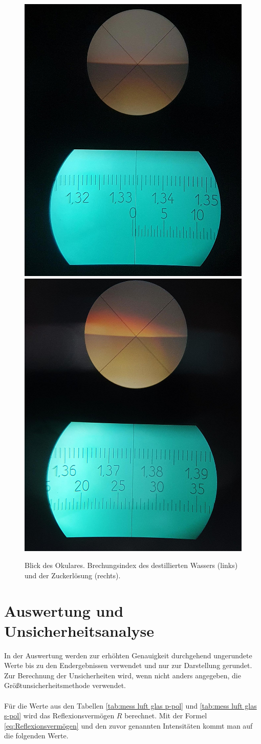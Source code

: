 \documentclass[12pt,a4paper,twoside]{article}
\begin{document}
\begin{figure}[H]
    \centering
    \includegraphics[width=0.4\linewidth]{nudes/wasser okular.jpg}
    \includegraphics[width=0.4\linewidth]{nudes/zucker okular.jpg}
    \caption{Blick des Okulares. Brechungsindex des destillierten Wassers (links) und der Zuckerlösung (rechts). }
    \label{fig:zucker wasser}
\end{figure}

\section{Auswertung und Unsicherheitsanalyse} %
In der Auswertung werden zur erhöhten Genauigkeit durchgehend ungerundete Werte bis zu den Endergebnissen verwendet und nur zur Darstellung gerundet. \\
Zur Berechnung der Unsicherheiten wird, wenn nicht anders angegeben, die Größtunsicherheitsmethode verwendet.
\\
\\
Für die Werte aus den Tabellen \ref{tab:mess luft glas p-pol} und \ref{tab:mess luft glas s-pol} wird das Reflexionsvermögen $R$ berechnet. 
Mit der Formel \ref{eq:Reflexionsvermögen} und den zuvor genannten Intensitäten kommt man auf die folgenden Werte. 
\end{document}
